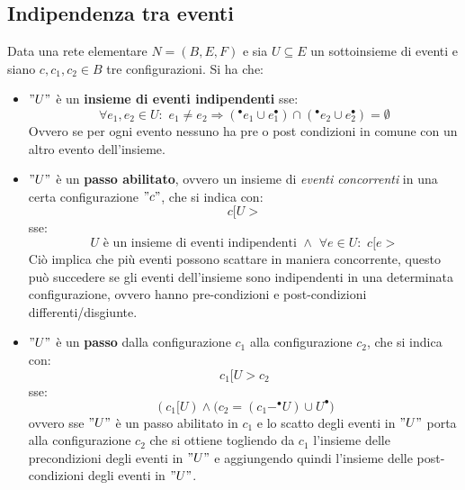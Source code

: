 \subsection{Indipendenza tra eventi}
\begin{definizione}
  Data una rete elementare $N=(B, E, F)$ e sia $U \subseteq E$ un sottoinsieme di
  eventi e siano $c, c_1, c_2\in B$ tre configurazioni. Si ha che:
  \begin{itemize}
    \item $"U"$ è un \textbf{insieme di eventi indipendenti} sse:
    \[\forall e_1, e_2\in U:\,\, e_1\neq e_2\Rightarrow (^\bullet e_1\cup
      e_1^\bullet)\cap  (^\bullet e_2\cup e_2^\bullet) = \emptyset\]
    Ovvero se per ogni evento nessuno ha pre o post condizioni in
comune con un altro evento dell’insieme.
    \item $"U"$ è un \textbf{passo abilitato}, ovvero un insieme di \textit{eventi
      concorrenti} in una certa configurazione $"c"$, che si indica con:
    \[c[U>\]
    sse:
    \[U \mbox{ è un insieme di eventi indipendenti } \wedge\,\, \forall e\in
      U:\,\, c[e>\]
      Ciò implica che più eventi possono scattare in maniera concorrente, questo può
succedere se gli eventi dell'insieme sono indipendenti in una determinata configurazione, ovvero hanno pre-condizioni e post-condizioni differenti/disgiunte.
    \item $"U"$ è un \textbf{passo} dalla configurazione $c_1$ alla configurazione
    $c_2$, che si indica con:
    \[c_1[U > c_2\]
    sse:
    \[(c_1[U) \wedge \Big(c_2=(c_1-^\bullet U)\cup U^\bullet\Big)\]
    ovvero sse $"U"$ è un passo abilitato in $c_1$ e lo scatto degli eventi in $"U"$
    porta alla configurazione $c_2$ che si ottiene togliendo da $c_1$ l'insieme
    delle precondizioni degli eventi in $"U"$ e aggiungendo quindi l'insieme delle
    post-condizioni degli eventi in $"U"$.
  \end{itemize}
\end{definizione} \vspace{5mm} %
